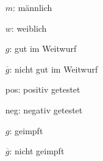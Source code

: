 \begin{exercise}
\begin{minipage}{0.58\linewidth}
      \begin{itemize}
        \renewcommand{\itemsep}{-1ex}%
        \item[$m$:]\glqq männlich\grqq
        \item[$w$:]\glqq weiblich\grqq
        \item[$g$:]\glqq gut im Weitwurf\grqq
        \item[$\overline{g}$:]\glqq nicht gut im Weitwurf\grqq
      \end{itemize}
    \end{minipage}\par
    \begin{minipage}{0.41\linewidth}
      \begin{fofotab}%
      \end{fofotab}
    \end{minipage}%
    \begin{minipage}{0.58\linewidth}
      \begin{itemize}
        \renewcommand{\itemsep}{-1ex}%
        \item[pos:]\glqq positiv getestet\grqq
        \item[neg:]\glqq negativ getestet\grqq
        \item[$g$:]\glqq geimpft\grqq
        \item[$\overline{g}$:]\glqq nicht geimpft\grqq
      \end{itemize}
    \end{minipage}\par
  \fi
\end{exercise}
